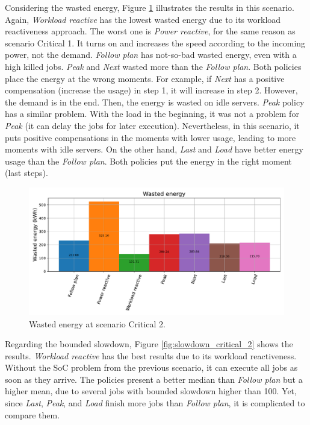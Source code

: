 Considering the wasted energy, Figure \ref{fig:energy_critical_2} illustrates the results in this scenario. Again, \emph{Workload reactive} has the lowest wasted energy due to its workload reactiveness approach. The worst one is \emph{Power reactive}, for the same reason as scenario Critical 1. It turns on and increases the speed according to the incoming power, not the demand. \emph{Follow plan} has not-so-bad wasted energy, even with a high killed jobs. \emph{Peak} and \emph{Next} wasted more than the \emph{Follow plan}. Both policies place the energy at the wrong moments. For example, if \emph{Next} has a positive compensation (increase the usage) in step 1, it will increase in step 2. However, the demand is in the end. Then, the energy is wasted on idle servers. \emph{Peak} policy has a similar problem. With the load in the beginning, it was not a problem for \emph{Peak} (it can delay the jobs for later execution). Nevertheless, in this scenario, it puts positive compensations in the moments with lower usage, leading to more moments with idle servers. On the other hand, \emph{Last} and \emph{Load} have better energy usage than the \emph{Follow plan}. Both policies put the energy in the right moment (last steps).

\begin{figure}[!htb]
    \centering
    \includegraphics[scale=0.55]{Images/Compensations/energy_critical_2.pdf}
    \caption{Wasted energy at scenario Critical 2.}
    \label{fig:energy_critical_2}
\end{figure}

Regarding the bounded slowdown, Figure \ref{fig:slowdown_critical_2} shows the results. \emph{Workload reactive} has the best results due to its workload reactiveness. Without the SoC problem from the previous scenario, it can execute all jobs as soon as they arrive. The policies present a better median than \emph{Follow plan} but a higher mean, due to several jobs with bounded slowdown higher than 100. Yet, since \emph{Last}, \emph{Peak}, and \emph{Load} finish more jobs than \emph{Follow plan}, it is complicated to compare them.

